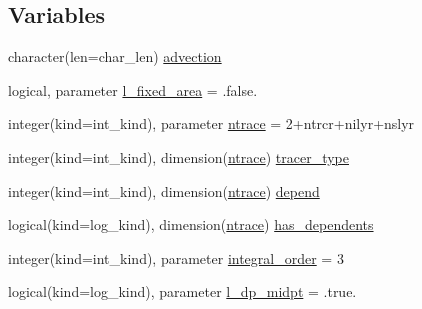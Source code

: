\subsection*{Variables}
\begin{DoxyCompactItemize}
\item 
character(len=char\_\-len) \hyperlink{namespaceice__transport__driver_a1c58448ed0a2533736be3ffabe94127f}{advection}
\item 
logical, parameter \hyperlink{namespaceice__transport__driver_ad4c977aa8b5dab5551cb2b87392ff8eb}{l\_\-fixed\_\-area} = .false.
\item 
integer(kind=int\_\-kind), parameter \hyperlink{namespaceice__transport__driver_acd10161556f58f5f0de2dadd68565201}{ntrace} = 2+ntrcr+nilyr+nslyr
\item 
integer(kind=int\_\-kind), dimension(\hyperlink{namespaceice__transport__driver_acd10161556f58f5f0de2dadd68565201}{ntrace}) \hyperlink{namespaceice__transport__driver_a04137caf1a5335b66116ec171d0bfe44}{tracer\_\-type}
\item 
integer(kind=int\_\-kind), dimension(\hyperlink{namespaceice__transport__driver_acd10161556f58f5f0de2dadd68565201}{ntrace}) \hyperlink{namespaceice__transport__driver_ab13adb14cbe8d413f23beb0e75252023}{depend}
\item 
logical(kind=log\_\-kind), dimension(\hyperlink{namespaceice__transport__driver_acd10161556f58f5f0de2dadd68565201}{ntrace}) \hyperlink{namespaceice__transport__driver_a377931b1b7093fce2f15ea1930370cd1}{has\_\-dependents}
\item 
integer(kind=int\_\-kind), parameter \hyperlink{namespaceice__transport__driver_aeed35e7d53b7d7304b207337c111028b}{integral\_\-order} = 3
\item 
logical(kind=log\_\-kind), parameter \hyperlink{namespaceice__transport__driver_a246442f9a224a039eee37618a4cc0751}{l\_\-dp\_\-midpt} = .true.
\end{DoxyCompactItemize}


